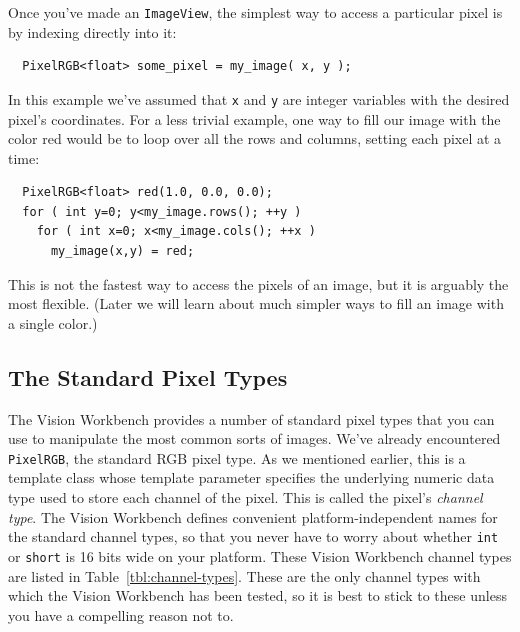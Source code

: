 Once you've made an \verb#ImageView#, the simplest way to access a
particular pixel is by indexing directly into it:
\begin{verbatim}
  PixelRGB<float> some_pixel = my_image( x, y );
\end{verbatim}
In this example we've assumed that \verb#x# and \verb#y# are integer
variables with the desired pixel's coordinates.  For a less trivial
example, one way to fill our image with the color red would be to loop
over all the rows and columns, setting each pixel at a time:
\begin{verbatim}
  PixelRGB<float> red(1.0, 0.0, 0.0);
  for ( int y=0; y<my_image.rows(); ++y )
    for ( int x=0; x<my_image.cols(); ++x )
      my_image(x,y) = red;
\end{verbatim}
This is not the fastest way to access the pixels of an image, but
it is arguably the most flexible.  (Later we will learn about much
simpler ways to fill an image with a single color.)

\subsection{The Standard Pixel Types}

The Vision Workbench provides a number of standard pixel types that
you can use to manipulate the most common sorts of images.  We've
already encountered \verb#PixelRGB#, the standard RGB pixel type.  As
we mentioned earlier, this is a template class whose template
parameter specifies the underlying numeric data type used to store
each channel of the pixel.  This is called the pixel's {\it channel
  type}.  The Vision Workbench defines convenient platform-independent
names for the standard channel types, so that you never have to worry
about whether \verb#int# or \verb#short# is 16 bits wide on your
platform.  These Vision Workbench channel types are listed in
Table~\ref{tbl:channel-types}.  These are the only channel types with
which the Vision Workbench has been tested, so it is best to stick to
these unless you have a compelling reason not to.

